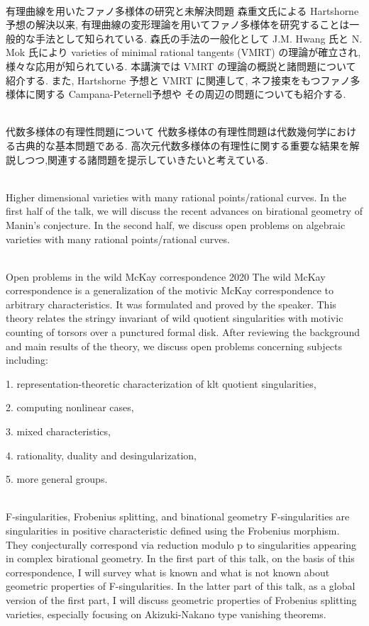 \documentclass[a4]{jarticle}
\theoremstyle{plain} %
\theoremstyle{definition} %
\begin{document}
\newpage
{}\\
有理曲線を用いたファノ多様体の研究と未解決問題
\vskip3mm
森重文氏による Hartshorne 予想の解決以来, 
有理曲線の変形理論を用いてファノ多様体を研究することは一般的な手法として知られている. 
森氏の手法の一般化として J.M. Hwang 氏と N. Mok 氏により varieties of minimal rational
tangents (VMRT)
の理論が確立され, 様々な応用が知られている. 
本講演では VMRT の理論の概説と諸問題について紹介する. 
また, Hartshorne 予想と VMRT に関連して, ネフ接束をもつファノ多様体に関する Campana-Peternell予想や
その周辺の問題についても紹介する. 
\vskip5mm


\\
代数多様体の有理性問題について
\vskip3mm
代数多様体の有理性問題は代数幾何学における古典的な基本問題である. 高次元代数多様体の有理性に関する重要な結果を解説しつつ,関連する諸問題を提示していきたいと考えている.
\vskip5mm


\\
Higher dimensional varieties with many rational points/rational curves.
\vskip3mm
In the first half of the talk, we will discuss the recent advances on birational geometry of Manin's conjecture. 
In the second half, we discuss open problems on algebraic varieties with many rational points/rational curves.
\vskip5mm




\\
Open problems in the wild McKay correspondence 2020
\vskip3mm
The wild McKay correspondence is a generalization of the motivic McKay correspondence to arbitrary characteristics. It was formulated and proved by the speaker. This theory relates the stringy invariant of wild quotient singularities with motivic counting of torsors over a punctured formal disk. After reviewing the background and main results of the theory, we discuss open problems concerning subjects including:

1. representation-theoretic characterization of klt quotient singularities,

2. computing nonlinear cases,

3. mixed characteristics,

4. rationality, duality and desingularization,

5. more general groups.
\vskip5mm




\\
 F-singularities, Frobenius splitting, and binational geometry 
\vskip3mm
F-singularities are singularities in positive characteristic defined using the Frobenius morphism. 
They conjecturally correspond via reduction modulo p to singularities appearing in complex birational geometry.
 In the first part of this talk, on the basis of this correspondence, I will survey what is known and what is not known about geometric properties of F-singularities. 
 In the latter part of this talk, as a global version of the first part, I will discuss geometric properties of Frobenius splitting varieties, especially focusing on Akizuki-Nakano type vanishing theorems.  
\vskip5mm
\end{document}
